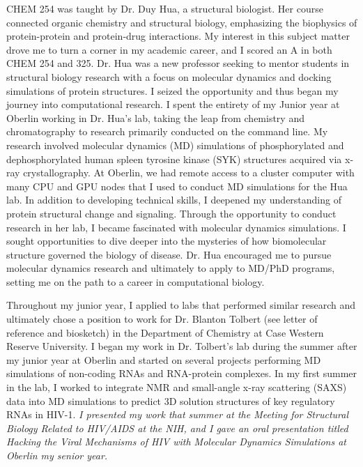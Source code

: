 \documentclass{NIHGrant}
\begin{document}
CHEM 254 was taught by Dr. Duy Hua, a structural biologist. Her course connected organic chemistry and structural biology, emphasizing the biophysics of protein-protein and protein-drug interactions. My interest in this subject matter drove me to turn a corner in my academic career, and I scored an A in both CHEM 254 and 325. Dr. Hua was a new professor seeking to mentor students in structural biology research with a focus on molecular dynamics and docking simulations of protein structures. I seized the opportunity and thus began my journey into computational research. I spent the entirety of my Junior year at Oberlin working in Dr. Hua's lab, taking the leap from chemistry and chromatography to research primarily conducted on the command line. My research involved molecular dynamics (MD) simulations of phosphorylated and dephosphorylated human spleen tyrosine kinase (SYK) structures acquired via x-ray crystallography. At Oberlin, we had remote access to a cluster computer with many CPU and GPU nodes that I used to conduct MD simulations for the Hua lab. In addition to developing technical skills, I deepened my understanding of protein structural change and signaling. Through the opportunity to conduct research in her lab, I became fascinated with molecular dynamics simulations. I sought opportunities to dive deeper into the mysteries of how biomolecular structure governed the biology of disease. Dr. Hua encouraged me to pursue molecular dynamics research and ultimately to apply to MD/PhD programs, setting me on the path to a career in computational biology.

Throughout my junior year, I applied to labs that performed similar research and ultimately chose a position to work for Dr. Blanton Tolbert (see letter of reference and biosketch) in the Department of Chemistry at Case Western Reserve University. I began my work in Dr. Tolbert's lab during the summer after my junior year at Oberlin and started on several projects performing MD simulations of non-coding RNAs and RNA-protein complexes. In my first summer in the lab, I worked to integrate NMR and small-angle x-ray scattering (SAXS) data into MD simulations to predict 3D solution structures of key regulatory RNAs in HIV-1. \emph{I presented my work that summer at the Meeting for Structural Biology Related to HIV/AIDS at the NIH, and I gave an oral presentation titled \textit{Hacking the Viral Mechanisms of HIV with Molecular Dynamics Simulations} at Oberlin my senior year.}
\end{document}
